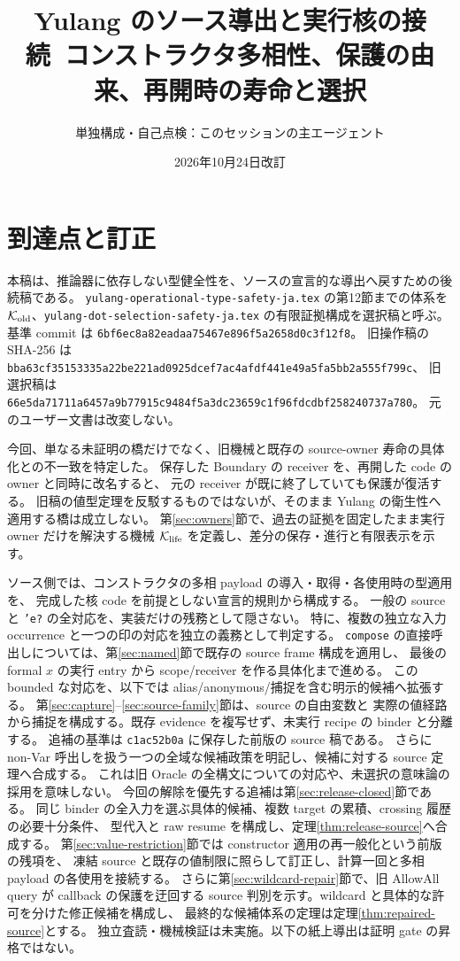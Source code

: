 \documentclass[11pt,a4paper]{article}
\title{Yulang のソース導出と実行核の接続\
\large コンストラクタ多相性、保護の由来、再開時の寿命と選択}
\author{単独構成・自己点検：このセッションの主エージェント}
\date{2026年10月24日改訂}
\newcommand{\Core}{\mathcal K}
\begin{document}
\maketitle

\section*{到達点と訂正}

本稿は、推論器に依存しない型健全性を、ソースの宣言的な導出へ戻すための後続稿である。
\nolinkurl{yulang-operational-type-safety-ja.tex} の第12節までの体系を
\(\Core_{\rm old}\)、\nolinkurl{yulang-dot-selection-safety-ja.tex} の有限証拠構成を選択稿と呼ぶ。
基準 commit は \texttt{6bf6ec8a82eadaa75467e896f5a2658d0c3f12f8}。
旧操作稿の SHA-256 は
\nolinkurl{bba63cf35153335a22be221ad0925dcef7ac4afdf441e49a5fa5bb2a555f799c}、
旧選択稿は
\nolinkurl{66e5da71711a6457a9b77915c9484f5a3dc23659c1f96fdcdbf258240737a780}。
元のユーザー文書は改変しない。

今回、単なる未証明の橋だけでなく、旧機械と既存の source-owner 寿命の具体化との不一致を特定した。
保存した Boundary の receiver を、再開した code の owner と同時に改名すると、
元の receiver が既に終了していても保護が復活する。
旧稿の値型定理を反駁するものではないが、そのまま Yulang の衛生性へ適用する橋は成立しない。
第\ref{sec:owners}節で、過去の証拠を固定したまま実行 owner だけを解決する機械
\(\Core_{\rm life}\) を定義し、差分の保存・進行と有限表示を示す。

ソース側では、コンストラクタの多相 payload の導入・取得・各使用時の型適用を、
完成した核 code を前提としない宣言的規則から構成する。
一般の source と \texttt{'e?} の全対応を、実装だけの残務として隠さない。
特に、複数の独立な入力 occurrence と一つの印の対応を独立の義務として判定する。
\texttt{compose} の直接呼出しについては、第\ref{sec:named}節で既存の source frame 構成を適用し、
最後の formal \(x\) の実行 entry から scope/receiver を作る具体化まで進める。
この bounded な対応を、以下では alias/anonymous/捕捉を含む明示的候補へ拡張する。
第\ref{sec:capture}--\ref{sec:source-family}節は、source の自由変数と
実際の値経路から捕捉を構成する。既存 evidence を複写せず、未実行 recipe の binder と分離する。
追補の基準は \texttt{c1ac52b0a} に保存した前版の source 稿である。
さらに non-Var 呼出しを扱う一つの全域な候補政策を明記し、候補に対する source 定理へ合成する。
これは旧 Oracle の全構文についての対応や、未選択の意味論の採用を意味しない。
今回の解除を優先する追補は第\ref{sec:release-closed}節である。
同じ binder の全入力を選ぶ具体的候補、複数 target の累積、crossing 履歴の必要十分条件、
型代入と raw resume を構成し、定理\ref{thm:release-source}へ合成する。
第\ref{sec:value-restriction}節では constructor 適用の再一般化という前版の残項を、
凍結 source と既存の値制限に照らして訂正し、計算一回と多相 payload の各使用を接続する。
さらに第\ref{sec:wildcard-repair}節で、旧 AllowAll query が callback の保護を迂回する
source 判別を示す。wildcard と具体的な許可を分けた修正候補を構成し、
最終的な候補体系の定理は定理\ref{thm:repaired-source}とする。
独立査読・機械検証は未実施。以下の紙上導出は証明 gate の昇格ではない。
\end{document}
